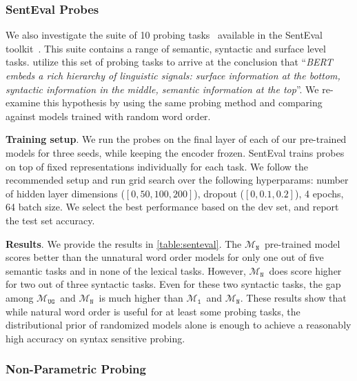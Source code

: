 \documentclass[letterpaper, 12pt]{report}
\newcommand{\xhdr}[1]{{\noindent\bfseries #1}.}
\newcommand{\OR}{$\mathcal{M}_{\texttt{N}}$}
\newcommand{\RI}{$\mathcal{M}_{\texttt{1}}$}
\newcommand{\RC}{$\mathcal{M}_{\texttt{UG}}$}
\begin{document}
\subsubsection{SentEval Probes}

We also investigate the suite of 10 probing tasks~\cite{conneau-etal-2018-cram} available in the SentEval toolkit~\cite{conneau-kiela-2018-senteval}. This suite contains a range of semantic, syntactic and surface level tasks. \citet{jawahar2019a} utilize this set of probing tasks to arrive at the conclusion that %
``\textit{BERT embeds a rich hierarchy of linguistic signals: surface information at the bottom, syntactic information in the middle, semantic information at the top}''. We re-examine this hypothesis by using the same probing method and comparing against models trained with random word order.

\xhdr{Training setup} We run the probes on the final layer of each of our pre-trained models for three seeds, while keeping the encoder frozen. %
SentEval %
trains %
probes on top of fixed representations individually for each task. We follow the recommended setup and run grid search over the following hyperparams: number of hidden layer dimensions ($[0,50,100,200]$), dropout ($[0, 0.1, 0.2]$), 4 epochs, 64 batch size.
We select the best performance based on the dev set, and report the test set accuracy.

\xhdr{Results} We provide the results in \autoref{table:senteval}. The \OR\ pre-trained model scores better than the unnatural word order models for only one out of five semantic tasks and in none of the lexical tasks. However, \OR\ does score higher for two out of three syntactic tasks. Even for these two syntactic tasks, the gap among \RC\ and \OR\ is much higher than \RI\ and \OR. These results show that while natural word order is useful for at least some probing tasks, the distributional prior of randomized models alone is enough to achieve a reasonably high accuracy on syntax sensitive probing.

\subsubsection{Non-Parametric Probing}
\label{sec:non_param_probe}
\end{document}
